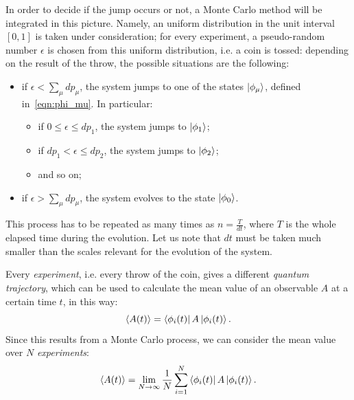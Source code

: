 In order to decide if the jump occurs or not, a Monte Carlo method will be integrated in this picture. Namely, an uniform distribution in the unit interval $[0,1]$ is taken under consideration; for every experiment, a pseudo-random number $\epsilon$ is chosen from this uniform distribution, i.e. a coin is tossed: depending on the result of the throw, the possible situations are the following:
\begin{itemize}
    \item if $\epsilon < \sum_\mu dp_\mu$, the system jumps to one of the states $\ket{\phi_\mu}$, defined in~\ref{eqn:phi_mu}. In particular:
    \begin{itemize}
        \item if $0 \leq \epsilon \leq dp_1$, the system jumps to $\ket{\phi_1}$;
        \item if $dp_1 < \epsilon \leq dp_2$, the system jumps to $\ket{\phi_2}$;
        \item and so on;
    \end{itemize}
    \item if $\epsilon > \sum_\mu dp_\mu$, the system evolves to the state $\ket{\phi_0}$.
\end{itemize}

This process has to be repeated as many times as $n = \frac{T}{dt}$, where $T$ is the whole elapsed time during the evolution. Let us note that $dt$ must be taken much smaller than the scales relevant for the evolution of the system.

Every \emph{experiment}, i.e. every throw of the coin, gives a different \emph{quantum trajectory}, which can be used to calculate the mean value of an observable $A$ at a certain time $t$, in this way:
\begin{equation}
    \langle A(t)\rangle = \bra{\phi_i(t)}A\ket{\phi_i(t)}.
\end{equation}
Since this results from a Monte Carlo process, we can consider the mean value over $N$ \emph{experiments}:
\begin{equation}
    \langle A(t)\rangle = \lim_{N\to\infty} \frac{1}{N}\sum_{i=1}^{N}\bra{\phi_i(t)}A\ket{\phi_i(t)}.
\end{equation}


